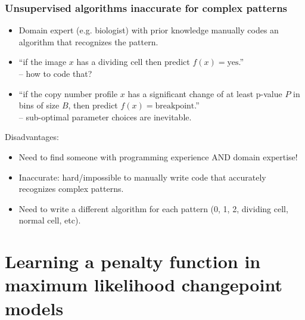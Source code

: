 \documentclass{beamer}
\begin{document}
\begin{frame}
  \frametitle{Unsupervised algorithms inaccurate for 
    complex patterns}
  \begin{itemize}
  \item Domain expert (e.g. biologist) with prior knowledge manually codes an
    algorithm that recognizes the pattern.
  \item ``if the image $x$ has a dividing cell then predict
    $f(x)=\text{yes}$.''\\
    -- how to code that?
  \item ``if the copy number profile $x$ has a significant change of
    at least p-value $P$ in bins of size $B$, then predict
    $f(x)=\text{breakpoint}$.''\\
    -- sub-optimal parameter choices are inevitable.
    \end{itemize}
Disadvantages:
\begin{itemize}
  \item Need to find someone with programming experience AND domain expertise!
  \item Inaccurate: hard/impossible to manually write code that
    accurately recognizes complex patterns.
  \item Need to write a different algorithm for each pattern (0, 1, 2,
    dividing cell, 
    normal cell,
    etc).
  \end{itemize}
\end{frame}

\section*{Learning a penalty function in maximum likelihood changepoint models}
\end{document}
